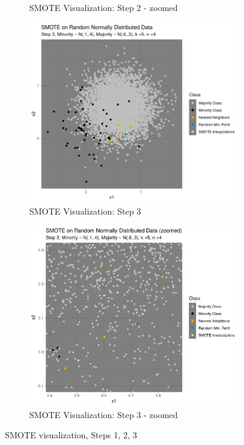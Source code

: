 \documentclass[12pt,a4paper]{article}
\begin{document}
\begin{figure}[]
\begin{subfigure}{0.48\textwidth}
\caption{SMOTE Visualization: Step 2 - zoomed} \label{fig:a}
\end{subfigure}
\medskip
\begin{subfigure}{0.48\textwidth}
\includegraphics[width=\linewidth]{./graphics/knn003.png}
\caption{SMOTE Visualization: Step 3} \label{fig:a}
\end{subfigure}\hspace*{\fill}
\begin{subfigure}{0.48\textwidth}
\includegraphics[width=\linewidth]{./graphics/knn_zoom003.png}
\caption{SMOTE Visualization: Step 3 - zoomed} \label{fig:a}
\end{subfigure}
\caption{SMOTE visualization, Steps 1, 2, 3} \label{fig:smote_vis_1}
\end{figure}
\end{document}
